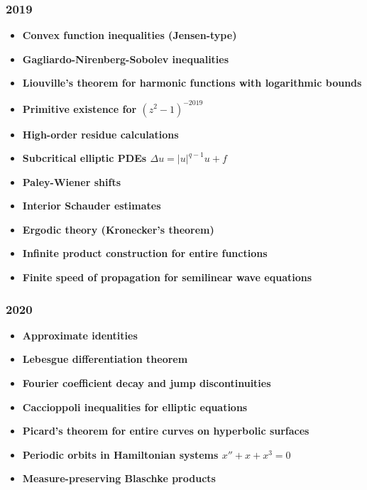 \subsubsection*{2019}
\begin{itemize}
    \item \textbf{Convex function inequalities (Jensen-type)}
    \item \textbf{Gagliardo-Nirenberg-Sobolev inequalities}
    \item \textbf{Liouville's theorem for harmonic functions with logarithmic bounds}
    \item \textbf{Primitive existence for $(z^2-1)^{-2019}$}
    \item \textbf{High-order residue calculations}
    \item \textbf{Subcritical elliptic PDEs $\Delta u = |u|^{q-1}u + f$}
    \item \textbf{Paley-Wiener shifts}
    \item \textbf{Interior Schauder estimates}
    \item \textbf{Ergodic theory (Kronecker's theorem)}
    \item \textbf{Infinite product construction for entire functions}
    \item \textbf{Finite speed of propagation for semilinear wave equations}
\end{itemize}

\subsubsection*{2020}
\begin{itemize}
    \item \textbf{Approximate identities}
    \item \textbf{Lebesgue differentiation theorem}
    \item \textbf{Fourier coefficient decay and jump discontinuities}
    \item \textbf{Caccioppoli inequalities for elliptic equations}
    \item \textbf{Picard's theorem for entire curves on hyperbolic surfaces}
    \item \textbf{Periodic orbits in Hamiltonian systems $x'' + x + x^3 = 0$}
    \item \textbf{Measure-preserving Blaschke products}
\end{itemize}

